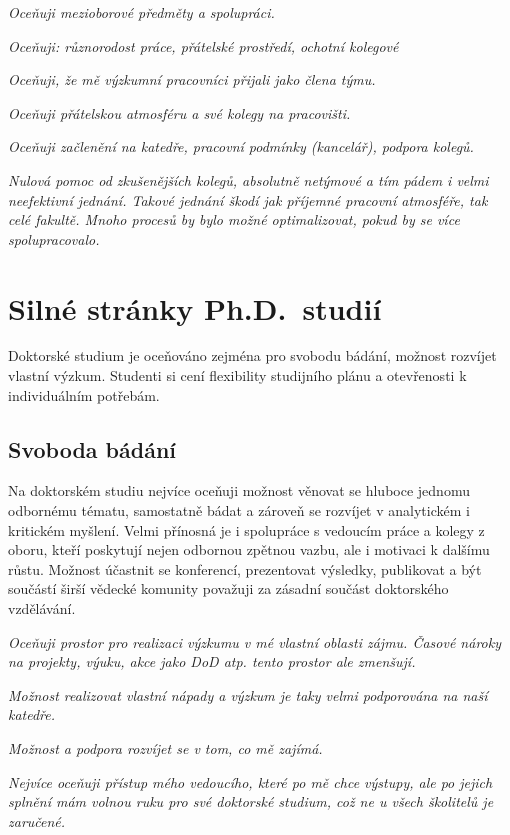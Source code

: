 \documentclass[
  czech,
  14pt,
  a4paper,
  DIV=11,
  numbers=noendperiod]{scrreprt}
\begin{document}
\emph{Oceňuji mezioborové předměty a spolupráci.}

\emph{Oceňuji: různorodost práce, přátelské prostředí, ochotní kolegové}

\emph{Oceňuji, že mě výzkumní pracovníci přijali jako člena týmu.}

\emph{Oceňuji přátelskou atmosféru a své kolegy na pracovišti.}

\emph{Oceňuji začlenění na katedře, pracovní podmínky (kancelář),
podpora kolegů.}

\emph{Nulová pomoc od zkušenějších kolegů, absolutně netýmové a tím
pádem i velmi neefektivní jednání. Takové jednání škodí jak příjemné
pracovní atmosféře, tak celé fakultě. Mnoho procesů by bylo možné
optimalizovat, pokud by se více spolupracovalo.}

\section{Silné stránky
Ph.D.~studií}\label{silnuxe9-struxe1nky-ph.d.-studiuxed}

Doktorské studium je oceňováno zejména pro svobodu bádání, možnost
rozvíjet vlastní výzkum. Studenti si cení flexibility studijního plánu a
otevřenosti k individuálním potřebám.

\subsection{Svoboda bádání}\label{svoboda-buxe1duxe1nuxed}

Na doktorském studiu nejvíce oceňuji možnost věnovat se hluboce jednomu
odbornému tématu, samostatně bádat a zároveň se rozvíjet v analytickém i
kritickém myšlení. Velmi přínosná je i spolupráce s vedoucím práce a
kolegy z oboru, kteří poskytují nejen odbornou zpětnou vazbu, ale i
motivaci k dalšímu růstu. Možnost účastnit se konferencí, prezentovat
výsledky, publikovat a být součástí širší vědecké komunity považuji za
zásadní součást doktorského vzdělávání.

\emph{Oceňuji prostor pro realizaci výzkumu v mé vlastní oblasti zájmu.
Časové nároky na projekty, výuku, akce jako DoD atp. tento prostor ale
zmenšují.}

\emph{Možnost realizovat vlastní nápady a výzkum je taky velmi
podporována na naší katedře.}

\emph{Možnost a podpora rozvíjet se v tom, co mě zajímá.}

\emph{Nejvíce oceňuji přístup mého vedoucího, které po mě chce výstupy,
ale po jejich splnění mám volnou ruku pro své doktorské studium, což ne
u všech školitelů je zaručené.}
\end{document}
